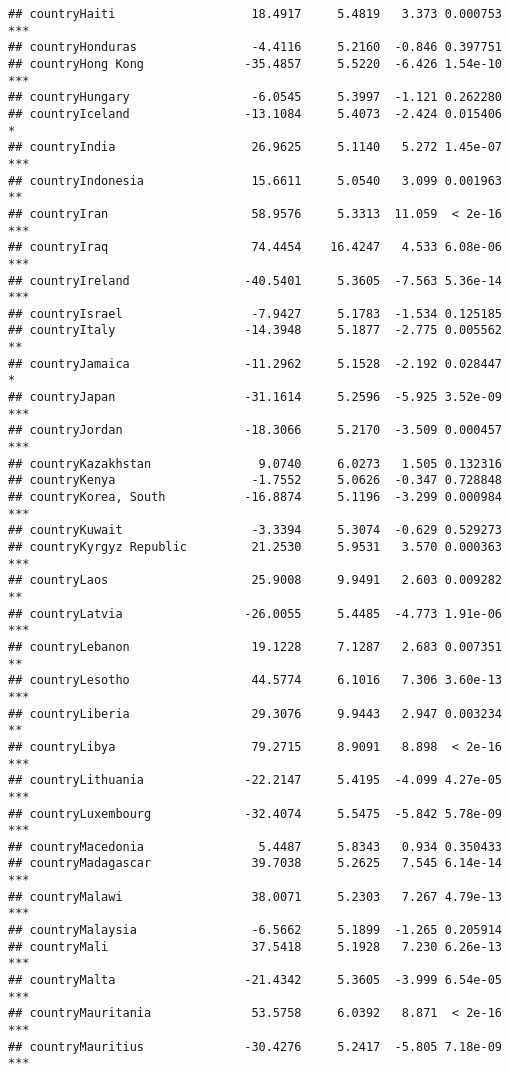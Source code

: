 \documentclass[
  11pt,
]{article}
\begin{document}
\begin{verbatim}
## countryHaiti                   18.4917     5.4819   3.373 0.000753 ***
## countryHonduras                -4.4116     5.2160  -0.846 0.397751    
## countryHong Kong              -35.4857     5.5220  -6.426 1.54e-10 ***
## countryHungary                 -6.0545     5.3997  -1.121 0.262280    
## countryIceland                -13.1084     5.4073  -2.424 0.015406 *  
## countryIndia                   26.9625     5.1140   5.272 1.45e-07 ***
## countryIndonesia               15.6611     5.0540   3.099 0.001963 ** 
## countryIran                    58.9576     5.3313  11.059  < 2e-16 ***
## countryIraq                    74.4454    16.4247   4.533 6.08e-06 ***
## countryIreland                -40.5401     5.3605  -7.563 5.36e-14 ***
## countryIsrael                  -7.9427     5.1783  -1.534 0.125185    
## countryItaly                  -14.3948     5.1877  -2.775 0.005562 ** 
## countryJamaica                -11.2962     5.1528  -2.192 0.028447 *  
## countryJapan                  -31.1614     5.2596  -5.925 3.52e-09 ***
## countryJordan                 -18.3066     5.2170  -3.509 0.000457 ***
## countryKazakhstan               9.0740     6.0273   1.505 0.132316    
## countryKenya                   -1.7552     5.0626  -0.347 0.728848    
## countryKorea, South           -16.8874     5.1196  -3.299 0.000984 ***
## countryKuwait                  -3.3394     5.3074  -0.629 0.529273    
## countryKyrgyz Republic         21.2530     5.9531   3.570 0.000363 ***
## countryLaos                    25.9008     9.9491   2.603 0.009282 ** 
## countryLatvia                 -26.0055     5.4485  -4.773 1.91e-06 ***
## countryLebanon                 19.1228     7.1287   2.683 0.007351 ** 
## countryLesotho                 44.5774     6.1016   7.306 3.60e-13 ***
## countryLiberia                 29.3076     9.9443   2.947 0.003234 ** 
## countryLibya                   79.2715     8.9091   8.898  < 2e-16 ***
## countryLithuania              -22.2147     5.4195  -4.099 4.27e-05 ***
## countryLuxembourg             -32.4074     5.5475  -5.842 5.78e-09 ***
## countryMacedonia                5.4487     5.8343   0.934 0.350433    
## countryMadagascar              39.7038     5.2625   7.545 6.14e-14 ***
## countryMalawi                  38.0071     5.2303   7.267 4.79e-13 ***
## countryMalaysia                -6.5662     5.1899  -1.265 0.205914    
## countryMali                    37.5418     5.1928   7.230 6.26e-13 ***
## countryMalta                  -21.4342     5.3605  -3.999 6.54e-05 ***
## countryMauritania              53.5758     6.0392   8.871  < 2e-16 ***
## countryMauritius              -30.4276     5.2417  -5.805 7.18e-09 ***

\end{verbatim}
\end{document}
